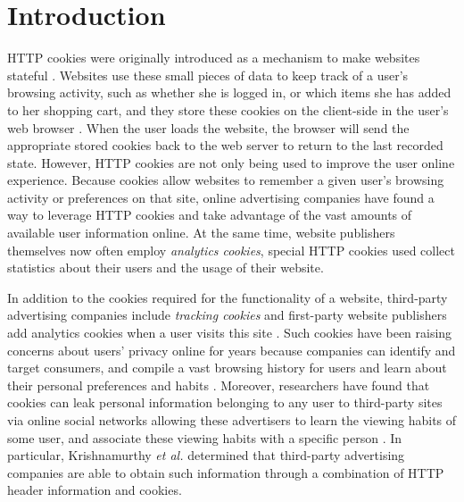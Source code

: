\section{Introduction}
\label{sec:intro}

HTTP cookies were originally introduced as a mechanism to make websites stateful \cite{httpcookies}.
Websites use these small pieces of data to keep track of a user's browsing activity, such as whether she is logged in, or which items she has added to her shopping cart, and they store these cookies on the client-side in the user's web browser \cite{httpcookies,guardian:cookies}.
When the user loads the website, the browser will send the appropriate stored cookies back to the web server to return to the last recorded state.
However, HTTP cookies are not only being used to improve the user online experience.
Because cookies allow websites to remember a given user's browsing activity or preferences on that site, online advertising companies have found a way to leverage HTTP cookies and take advantage of the vast amounts of available user information online.
At the same time, website publishers themselves now often employ \emph{analytics cookies}, special HTTP cookies used collect statistics about their users and the usage of their website.

In addition to the cookies required for the functionality of a website, third-party advertising companies include \emph{tracking cookies} and first-party website publishers add analytics cookies when a user visits this site \cite{guardian:cookies}.
Such cookies have been raising concerns about users' privacy online for years because companies can identify and target consumers, and compile a vast browsing history for users and learn about their personal preferences and habits \cite{wap:cookies,dntbill}.
Moreover, researchers have found that cookies can leak personal information belonging to any user to third-party
sites via online social networks allowing these advertisers to learn the viewing habits of some user, and associate these viewing habits with a specific person \cite{piiosn}. In particular, Krishnamurthy \emph{et al.} \cite{piiosn} determined that  third-party advertising companies are able to obtain such information through a combination of HTTP header information and cookies.

